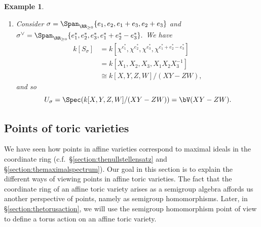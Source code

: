 \documentclass[12pt]{amsart}
\theoremstyle{plain}
\newtheorem{example}[theorem]{Example}
\begin{document}
\begin{example}
\begin{enumerate}
\begin{figure}[H]
\end{figure}
\noindent
While $\{2 e_1^* + e_2^*, e_2^*\}$ generates $\sigma^\vee$ as a cone, it does not generate $S_\sigma$ as a semigroup, since not every element in $S_\sigma$ lies in $\Span_{\ZZ_{\ge 0}} \{2 e_1^* + e_2^*,  e_2^*\}$.
For example, $e_1^* + e_2^* \in S_\sigma$, but $e_1^* + e_2^* \notin \Span_{\ZZ_{\ge 0}} \{2 e_1^* + e_2^*,  e_2^*\}.$
However, $\{e_2^*, 2 e_1^* + e_2^*,  e_1^* + e_2^*\}$ generates $S_\sigma$.
Then,
\begin{align*}
	\qquad k[S_\sigma] = k[\chi^{e_2^*}, \chi^{2 e_1^* + e_2^*}, \chi^{e_1^* + e_2^*}] &= k[X_2, X_1^2 X_2, X_1 X_2] \cong k[X, Y, Z] / (X Y - Z^2),
\end{align*}
and
$$U_\sigma = \Spec(k[X, Y, Z] / (XY - Z^2) )= \bV(X Y - Z^2).$$

\item
Consider $\sigma = \Span_{\RR_{\ge 0}}\{ e_1, e_2, e_1+e_3, e_2 + e_3\}$ and $\sigma^\vee = \Span_{\RR_{\ge 0}} \{e_1^*, e_2^*, e_3^*, e_1^* +e_2^* - e_3^*\}.$
We have 
\begin{align*}
	k[S_\sigma] &= k[\chi^{e_1^*}, \chi^{e_2^*}, \chi^{e_3^*}, \chi^{e_1^* +e_2^* - e_3^*}] \\
	&= k[X_1, X_2, X_3, X_1 X_2 X_3^{-1}] \\
	&\cong k[X, Y, Z, W]/(XY - ZW),
\end{align*}
and so
$$U_\sigma = \Spec(k[X, Y, Z, W] / (XY - ZW) ) = \bV(XY-ZW).$$
\end{enumerate}
\end{example}





\subsection{Points of toric varieties}\label{section:points}
We have seen how points in affine varieties correspond to maximal ideals in the coordinate ring (c.f.\ \S \ref{section:thenullstellensatz} and \S \ref{section:themaximalspectrum}).
Our goal in this section is to explain the different ways of viewing points in affine toric varieties.
The fact that the coordinate ring of an affine toric variety arises as a semigroup algebra affords us another perspective of points, namely as semigroup homomorphisms.
Later, in \S\ref{section:thetorusaction}, we will use the semigroup homomorphism point of view to define a torus action on an affine toric variety.
\end{document}
